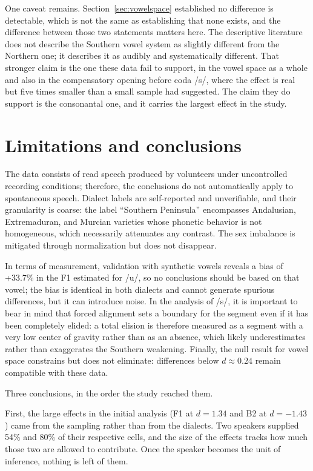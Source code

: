 \documentclass[11pt]{article}
\begin{document}
One caveat remains. Section~\ref{sec:vowelspace} established no difference is
detectable, which is not the same as establishing that none exists, and the
difference between those two statements matters here. The descriptive literature
does not describe the Southern vowel system as slightly different from the
Northern one; it describes it as audibly and systematically different. That
stronger claim is the one these data fail to support, in the vowel space as a
whole and also in the compensatory opening before coda /s/, where the effect is
real but five times smaller than a small sample had suggested. The claim they do
support is the consonantal one, and it carries the largest effect in the study.

\section{Limitations and conclusions}
\label{sec:limitations}

The data consists of read speech produced by volunteers under uncontrolled
recording conditions; therefore, the conclusions do not automatically apply to
spontaneous speech. Dialect labels are self-reported and unverifiable, and their
granularity is coarse: the label ``Southern Peninsula'' encompasses Andalusian,
Extremaduran, and Murcian varieties whose phonetic behavior is not homogeneous,
which necessarily attenuates any contrast. The sex imbalance is mitigated through
normalization but does not disappear.

In terms of measurement, validation with synthetic vowels reveals a bias of
+33.7\% in the F1 estimated for /u/, so no conclusions should be based on that
vowel; the bias is identical in both dialects and cannot generate spurious
differences, but it can introduce noise. In the analysis of /s/, it is important
to bear in mind that forced alignment sets a boundary for the segment even if it
has been completely elided: a total elision is therefore measured as a segment
with a very low center of gravity rather than as an absence, which likely
underestimates rather than exaggerates the Southern weakening. Finally, the null
result for vowel space constrains but does not eliminate: differences below
$d \approx 0.24$ remain compatible with these data.

Three conclusions, in the order the study reached them.

First, the large effects in the initial analysis (F1 at $d = 1.34$ and B2 at
$d = -1.43$) came from the sampling rather than from the dialects. Two
speakers supplied 54\% and 80\% of their respective cells, and the size of the
effects tracks how much those two are allowed to contribute. Once the speaker
becomes the unit of inference, nothing is left of them.
\end{document}
